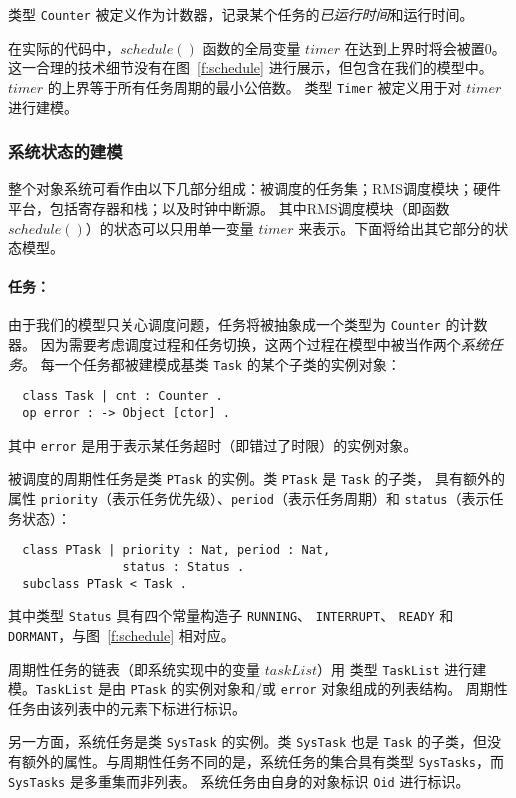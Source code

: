 类型 \verb|Counter| 被定义作为计数器，记录某个任务的\emph{已运行时间}和运行时间。

在实际的代码中，$\mathit{schedule()}$ 函数的全局变量 $\mathit{timer}$ 在达到上界时将会被置0。
这一合理的技术细节没有在图~\ref{f:schedule} 进行展示，但包含在我们的模型中。$\mathit{timer}$ 的上界等于所有任务周期的最小公倍数。
类型 \verb|Timer| 被定义用于对 $\mathit{timer}$ 进行建模。

\subsubsection{系统状态的建模}

整个对象系统可看作由以下几部分组成：被调度的任务集；RMS调度模块；硬件平台，包括寄存器和栈；以及时钟中断源。
其中RMS调度模块（即函数 $\mathit{schedule()}$）的状态可以只用单一变量 $\mathit{timer}$ 来表示。下面将给出其它部分的状态模型。

\paragraph{任务：} 
由于我们的模型只关心调度问题，任务将被抽象成一个类型为 \verb|Counter| 的计数器。
因为需要考虑调度过程和任务切换，这两个过程在模型中被当作两个\emph{系统任务}。
每一个任务都被建模成基类 \verb|Task| 的某个子类的实例对象：
\begin{verbatim}
  class Task | cnt : Counter .
  op error : -> Object [ctor] .
\end{verbatim}
其中 \verb|error| 是用于表示某任务超时（即错过了时限）的实例对象。

被调度的周期性任务是类 \verb|PTask| 的实例。类 \verb|PTask| 是 \verb|Task| 的子类，
具有额外的属性
\verb|priority|（表示任务优先级）、\verb|period|（表示任务周期）和 \verb|status|（表示任务状态）：
\begin{verbatim}
  class PTask | priority : Nat, period : Nat, 
                status : Status .
  subclass PTask < Task .
\end{verbatim}
其中类型 \verb|Status| 具有四个常量构造子
\verb|RUNNING|、 \verb|INTERRUPT|、 \verb|READY| 和 \verb|DORMANT|，与图~\ref{f:schedule} 相对应。

周期性任务的链表（即系统实现中的变量 $\mathit{taskList}$）用
类型 \verb|TaskList| 进行建模。\verb|TaskList| 是由
 \verb|PTask| 的实例对象和/或 \verb|error| 对象组成的列表结构。
周期性任务由该列表中的元素下标进行标识。

另一方面，系统任务是类 \verb|SysTask| 的实例。类 \verb|SysTask| 也是 \verb|Task| 的子类，但没有额外的属性。与周期性任务不同的是，系统任务的集合具有类型 \verb|SysTasks|，而 \verb|SysTasks| 是多重集而非列表。
系统任务由自身的对象标识 \verb|Oid| 进行标识。

